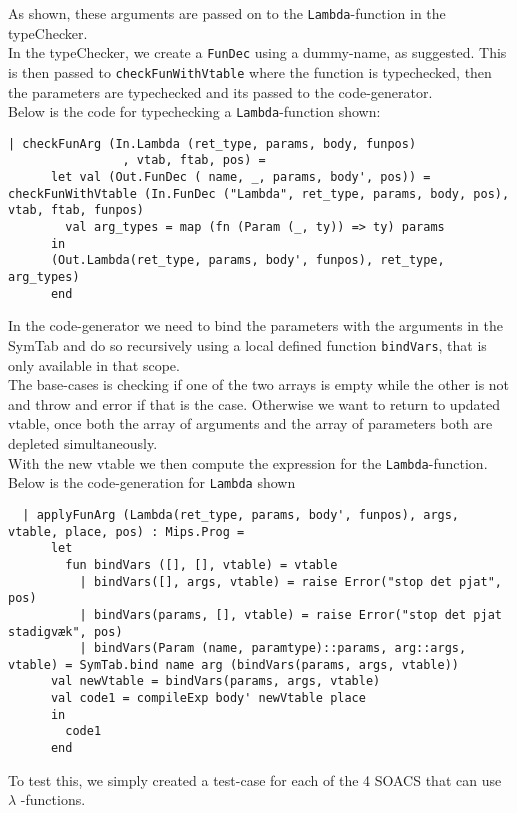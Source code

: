 \documentclass[paper=a4, fontsize=11pt]{scrartcl} %
\numberwithin{equation}{section} %
\numberwithin{figure}{section} %
\numberwithin{table}{section} %
\begin{document}
As shown, these arguments are passed on to the \verb"Lambda"-function in the typeChecker.\\
In the typeChecker, we create a \verb"FunDec" using a dummy-name, as suggested. This is then passed to \verb"checkFunWithVtable" where the function is typechecked, then the parameters are typechecked and its passed to the code-generator.\\
Below is the code for typechecking a \verb"Lambda"-function shown:
\begin{lstlisting}
| checkFunArg (In.Lambda (ret_type, params, body, funpos)
                , vtab, ftab, pos) = 
      let val (Out.FunDec ( name, _, params, body', pos)) = checkFunWithVtable (In.FunDec ("Lambda", ret_type, params, body, pos), vtab, ftab, funpos)
        val arg_types = map (fn (Param (_, ty)) => ty) params
      in  
      (Out.Lambda(ret_type, params, body', funpos), ret_type, arg_types)
      end
\end{lstlisting}

In the code-generator we need to bind the parameters with the arguments in the SymTab and do so recursively using a local defined function \verb"bindVars", that is only available in that scope.\\
The base-cases is checking if one of the two arrays is empty while the other is not and throw and error if that is the case. Otherwise we want to return to updated vtable, once both the array of arguments and the array of parameters both are depleted simultaneously.\\
With the new vtable we then compute the expression for the \verb"Lambda"-function.\\
Below is the code-generation for \verb"Lambda" shown
\begin{lstlisting}
  | applyFunArg (Lambda(ret_type, params, body', funpos), args, vtable, place, pos) : Mips.Prog = 
      let 
        fun bindVars ([], [], vtable) = vtable
          | bindVars([], args, vtable) = raise Error("stop det pjat", pos)
          | bindVars(params, [], vtable) = raise Error("stop det pjat stadigvæk", pos)
          | bindVars(Param (name, paramtype)::params, arg::args, vtable) = SymTab.bind name arg (bindVars(params, args, vtable))
      val newVtable = bindVars(params, args, vtable)
      val code1 = compileExp body' newVtable place
      in
        code1
      end
\end{lstlisting}

To test this, we simply created a test-case for each of the 4 SOACS that can use $\lambda$ -functions.\\
\end{document}
